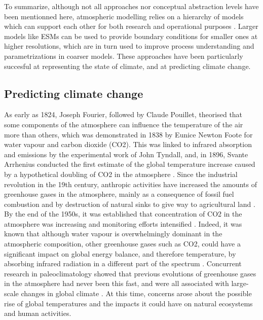 To summarize, although not all approaches nor conceptual abstraction levels have been mentionned here, atmospheric modelling relies on a hierarchy of models which can support each other for both research and operational purposes \citep{maher_model_2019}. Larger models like ESMs can be used to provide boundary conditions for smaller ones at higher resolutions, which are in turn used to improve process understanding and parametrizations in coarser models.
These approaches have been particularly succesful at representing the state of climate, and at predicting climate change.

\subsection{Predicting climate change}
As early as 1824, Joseph Fourier, followed by Claude Pouillet, theorised that some components of the atmosphere can influence the temperature of the air more than others, which was demonstrated in 1838 by Eunice Newton Foote for water vapour and carbon dioxide (CO2). This was linked to infrared absorption and emissions by the experimental work of John Tyndall, and, in 1896, Svante Arrhenius conducted the first estimate of the global temperature increase caused by a hypothetical doubling of CO2 in the atmosphere \citep{tyndall_j_xxiii_1861, arrhenius_xxxi_1896}.
Since the industrial revolution in the 19th century, anthropic activities have increased the amounts of greenhouse gases in the atmosphere, mainly as a consequence of fossil fuel combustion and by destruction of natural sinks to give way to agricultural land \citep{RN1}.
By the end of the 1950s, it was established that concentration of CO2 in the atmosphere was increasing and monitoring efforts intensified \citep{pales_concentration_1965}.
Indeed, it was known that although water vapour is overwhelmingly dominant in the atmospheric composition, other greenhouse gases such as CO2, could have a significant impact on global energy balance, and therefore temperature, by absorbing infrared radiation in a different part of the spectrum \citep{plass_carbon_1956}.
Concurrent research in paleoclimatology showed that previous evolutions of greenhouse gases in the atmosphere had never been this fast, and were all associated with large-scale changes in global climate \citep{lorius_30000-yr_1979}.
At this time, concerns arose about the possible rise of global temperatures and the impacts it could have on natural ecosystems and human activities.\citep{broecker_climatic_1975}

